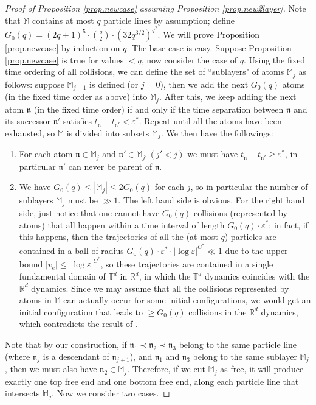 \documentclass[10pt, reqno]{amsart}
\newcommand{\Mb}{\mathbb M}
\newcommand{\Rb}{\mathbb R}
\newcommand{\Tb}{\mathbb T}
\newcommand{\nf}{\mathfrak n}
\theoremstyle{definition}
\theoremstyle{remark}
\numberwithin{equation}{section}
\begin{document}
\begin{proof}[Proof of Proposition \ref{prop.newcase} assuming Proposition \ref{prop.new2layer}] Note that $\Mb$ contains at most $q$ particle lines by assumption; define $G_0(q)=(2q+1)^{5}\cdot\binom{q}{2}\cdot (32q^{3/2})^{q^2}$. We will prove Proposition \ref{prop.newcase} by induction on $q$. The base case is easy. Suppose Proposition \ref{prop.newcase} is true for values $<q$, now consider the case of $q$. Using the fixed time ordering of all collisions, we can define the set of ``sublayers" of atoms $\Mb_j$ as follows: suppose $\Mb_{j-1}$ is defined (or $j=0$), then we add the next $G_0(q)$ atoms (in the fixed time order as above) into $\Mb_j$. After this, we keep adding the next atom $\nf$ (in the fixed time order) if and only if the time separation between $\nf$ and its successor $\nf'$ satisfies $t_\nf-t_{\nf'}<\varepsilon^*$. Repeat until all the atoms have been exhausted, so $\Mb$ is divided into subsets $\Mb_j$. We then have the followings:
\begin{enumerate}
\item For each atom $\nf\in\Mb_j$ and $\nf'\in\Mb_{j'}\,(j'<j)$ we must have $t_\nf-t_{\nf'}\geq\varepsilon^*$, in particular $\nf'$ can never be parent of $\nf$.
\item We have $G_0(q)\leq |\Mb_j|\leq 2G_0(q)$ for each $j$, so in particular the number of sublayers $\Mb_j$ must be $\gg 1$. The left hand side is obvious. For the right hand side, just notice that one cannot have $G_0(q)$ collisions (represented by atoms) that all happen within a time interval of length $G_0(q)\cdot \varepsilon^*$; in fact, if this happens, then the trajectories of all the (at most $q$) particles are contained in a ball of radius $G_0(q)\cdot \varepsilon^*\cdot |\log\varepsilon|^{C^*}\ll 1$ due to the upper bound $|v_e|\leq |\log\varepsilon|^{C^*}$, so these trajectories are contained in a single fundamental domain of $\Tb^d$ in $\Rb^d$, in which the $\Tb^d$ dynamics coincides with the $\Rb^d$ dynamics. Since we may assume that all the collisions represented by atoms in $\Mb$ can actually occur for some initial configurations, we would get an initial configuration that leads to $\geq G_0(q)$ collisions in the $\Rb^d$ dynamics, which contradicts the result of \cite{BFK98}.
\end{enumerate}

Note that by our construction, if $\nf_1\prec\nf_2\prec\nf_3$ belong to the same particle line (where $\nf_j$ is a descendant of $\nf_{j+1}$), and $\nf_1$ and $\nf_3$ belong to the same sublayer $\Mb_j$, then we must also have $\nf_2\in\Mb_j$. Therefore, if we cut $\Mb_j$ as free, it will produce exactly one top free end and one bottom free end, along each particle line that intersects $\Mb_j$. Now we consider two cases.


\end{proof}
\end{document}
